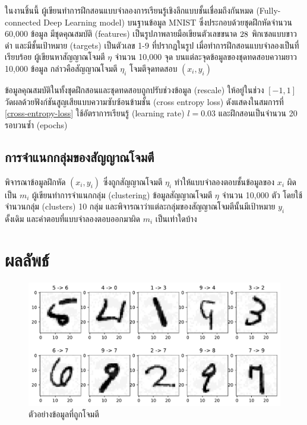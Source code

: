 \documentclass{cpepaper}
\begin{document}
ในงานชิ้นนี้ ผู้เขียนทำการฝึกสอนแบบจำลองการเรียนรู้เชิงลึกแบบชั้นเชื่อมถึงกันหมด (Fully-connected Deep Learning model) บนฐานข้อมูล MNIST \cite{lecun2010mnist} ซึ่งประกอบด้วยชุดฝึกหัดจำนวน 60,000 ข้อมูล มีชุดคุณสมบัติ (features) เป็นรูปภาพลายมือเขียนตัวเลขขนาด $28 \time 28$ พิกเซลแบบขาวดำ และมีชั้นเป้าหมาย (targets) เป็นตัวเลข 1-9 ที่ปรากฎในรูป เมื่อทำการฝึกสอนแบบจำลองเป็นที่เรียบร้อย ผู้เขียนหาสัญญาณโจมตี $\eta$ จำนวน 10,000 จุด บนแต่ละจุดข้อมูลของชุดทดสอบความยาว 10,000 ข้อมูล กล่าวคือสัญญาณโจมตี $\eta_i$ โจมตีจุดทดสอบ $\left(x_i, y_i \right)$

ข้อมูลคุณสมบัติในทั้งชุดฝึกสอนและชุดทดสอบถูกปรับช่วงข้อมูล (rescale) ให้อยู่ในช่วง $\left[-1, 1\right]$ วัดผลด้วยฟังก์ชันสูญเสียแบบความซับซ้อนข้ามชั้น (cross entropy loss) ดังแสดงในสมการที่ \ref{cross-entropy-loss} ใช้อัตราการเรียนรู้ (learning rate) $l = 0.03$ และฝึกสอนเป็นจำนวน 20 รอบวนซ้ำ (epochs)

\subsection{การจำแนกกลุ่มของสัญญาณโจมตี}

พิจารณาข้อมูลฝึกหัด $(x_i, y_i)$ ซึ่งถูกสัญญาณโจมตี $\eta_i$ ทำให้แบบจำลองตอบชั้นข้อมูลของ $x_i$ ผิดเป็น $m_i$ ผู้เขียนทำการจำแนกกลุ่ม (clustering) ข้อมูลสัญญาณโจมตี $\eta$ จำนวน 10,000 ตัว โดยใช้จำนวนกลุ่ม (clusters) 10 กลุ่ม และพิจารณาว่าแต่ละกลุ่มของสัญญาณโจมตีนั้นมีเป้าหมาย $y_i$ ดั้งเดิม และคำตอบที่แบบจำลองตอบออกมาผิด $m_i$ เป็นเท่าใดบ้าง

\section{ผลลัพธ์}

\begin{figure}
    \centering
    \includegraphics[width=\columnwidth]{images/adversarials.pdf}
    \caption{ตัวอย่างข้อมูลที่ถูกโจมตี}
    \label{adversarials}
\end{figure}
\end{document}
